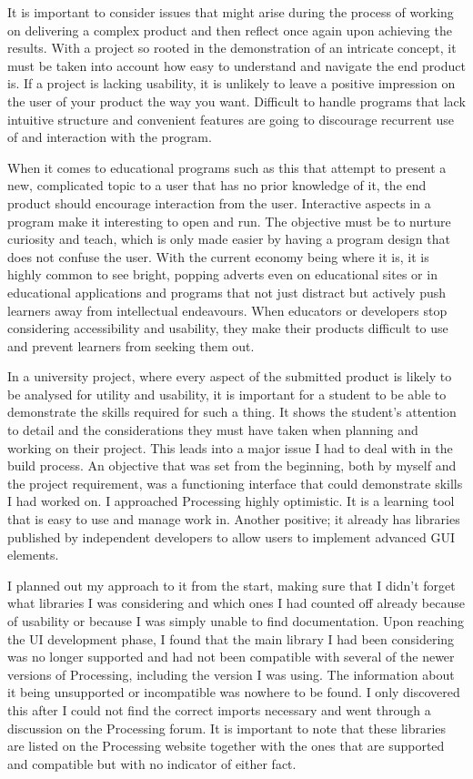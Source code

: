 \documentclass[]{final_report}
\begin{document}
It is important to consider issues that might arise during the process of working on delivering a complex product and then reflect once again upon achieving the results. With a project so rooted in the demonstration of an intricate concept, it must be taken into account how easy to understand and navigate the end product is. If a project is lacking usability, it is unlikely to leave a positive impression on the user of your product the way you want. Difficult to handle programs that lack intuitive structure and convenient features are going to discourage recurrent use of and interaction with the program. 

When it comes to educational programs such as this that attempt to present a new, complicated topic to a user that has no prior knowledge of it, the end product should encourage interaction from the user. Interactive aspects in a program make it interesting to open and run.  The objective must be to nurture curiosity and teach, which is only made easier by having a program design that does not confuse the user. With the current economy being where it is, it is highly common to see bright, popping adverts even on educational sites or in educational applications and programs that not just distract but actively push learners away from intellectual endeavours. When educators or developers stop considering accessibility and usability, they make their products difficult to use and prevent learners from seeking them out.

 In a university project, where every aspect of the submitted product is likely to be analysed for utility and usability, it is important for a student to be able to demonstrate the skills required for such a thing. It shows the student’s attention to detail and the considerations they must have taken when planning and working on their project. This leads into a major issue I had to deal with in the build process. An objective that was set from the beginning, both by myself and the project requirement, was a functioning interface that could demonstrate skills I had worked on. I approached Processing highly optimistic. It is a learning tool that is easy to use and manage work in. Another positive; it already has libraries published by independent developers to allow users to implement advanced GUI elements. 

I planned out my approach to it from the start, making sure that I didn’t forget what libraries I was considering and which ones I had counted off already because of usability or because I was simply unable to find documentation. Upon reaching the UI development phase, I found that the main library I had been considering was no longer supported and had not been compatible with several of the newer versions of Processing, including the version I was using. The information about it being unsupported or incompatible was nowhere to be found. I only discovered this after I could not find the correct imports necessary and went through a discussion on the Processing forum. It is important to note that these libraries are listed on the Processing website together with the ones that are supported and compatible but with no indicator of either fact. 
\end{document}
